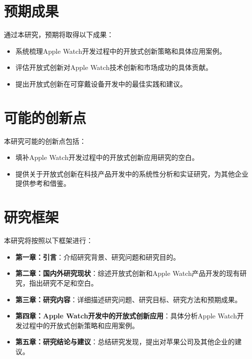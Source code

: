 \section{预期成果}

通过本研究，预期将取得以下成果：
\begin{itemize}
    \item 系统梳理Apple Watch开发过程中的开放式创新策略和具体应用案例。
    \item 评估开放式创新对Apple Watch技术创新和市场成功的具体贡献。
    \item 提出开放式创新在可穿戴设备开发中的最佳实践和建议。
\end{itemize}

\section{可能的创新点}

本研究可能的创新点包括：
\begin{itemize}
    \item 填补Apple Watch开发过程中的开放式创新应用研究的空白。
    \item 提供关于开放式创新在科技产品开发中的系统性分析和实证研究，为其他企业提供参考和借鉴。
\end{itemize}

\section{研究框架}

本研究将按照以下框架进行：
\begin{itemize}
    \item \textbf{第一章：引言}：介绍研究背景、研究问题和研究目的。
    \item \textbf{第二章：国内外研究现状}：综述开放式创新和Apple Watch产品开发的现有研究，指出研究不足和空白。
    \item \textbf{第三章：研究内容}：详细描述研究问题、研究目标、研究方法和预期成果。
    \item \textbf{第四章：Apple Watch开发中的开放式创新应用}：具体分析Apple Watch开发过程中的开放式创新策略和应用案例。
    \item \textbf{第五章：研究结论与建议}：总结研究发现，提出对苹果公司及其他企业的建议。
\end{itemize}
